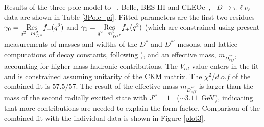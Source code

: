 \vspace{0.5cm}
Results of the three-pole model \cite{Becirevic:2014kaa} to \babar~\cite{babar-new}, Belle\cite{Widhalm:2006wz}, BES III\cite{BESIII-new} and 
CLEOc~\cite{Besson:2009uv},~\cite{Dobbs:2007aa} $D \to \pi \ell \nu_\ell $ data are shown in Table \ref{3Pole_pi}. 
Fitted parameters are the first two residues $\gamma_{0}=\underset{ q^2=m_{D^{\ast}}^2} {\rm Res} f_+(q^2) $ 
and $\gamma_{1}=\underset{q^2=m_{D^{\ast '}}^2}{\rm Res} f_+(q^2)$ (which are constrained using present measurements 
of masses and widths of the $D^\ast$ and $D^{\ast '}$ mesons, and lattice computations of decay constants, following  \cite{Becirevic:2014kaa}), 
and an effective mass, $m_{D^{\ast ''}_{eff}}$, accounting for higher mass hadronic contributions.
The $V_{cd}$ value enters in the fit and is constrained assuming unitarity of the CKM matrix.
The $\chi^2/d.o.f$ of the combined fit is $57.5/57$. The result of the effective mass $m_{D^{\ast ''}_{eff}}$ is larger than the mass of the 
second radially excited state with $J^P = 1^{-}$ ($\sim 3.11$~GeV), indicating that more contributions are needed to explain the form factor. 
Comparison of the combined fit with the individual data is shown in Figure \ref{plot3}.

